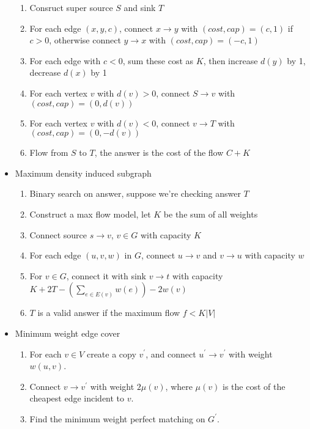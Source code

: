 \begin{itemize}[nosep]
    \begin{enumerate}[nosep]
      \item Consruct super source $S$ and sink $T$
      \item For each edge $(x, y, c)$, connect $x \rightarrow y$ with $(cost, cap) = (c, 1)$ if $c > 0$, otherwise connect $y \rightarrow x$ with $(cost, cap) = (-c, 1)$
      \item For each edge with $c < 0$, sum these cost as $K$, then increase $d(y)$ by 1, decrease $d(x)$ by 1
      \item For each vertex $v$ with $d(v) > 0$, connect $S \rightarrow v$ with $(cost, cap) = (0, d(v))$
      \item For each vertex $v$ with $d(v) < 0$, connect $v \rightarrow T$ with $(cost, cap) = (0, -d(v))$
      \item Flow from $S$ to $T$, the answer is the cost of the flow $C + K$
    \end{enumerate}
  \item Maximum density induced subgraph
    \begin{enumerate}[nosep]
      \item Binary search on answer, suppose we're checking answer $T$
      \item Construct a max flow model, let $K$ be the sum of all weights
      \item Connect source $s \rightarrow v$, $v \in G$ with capacity $K$
      \item For each edge $(u, v, w)$ in $G$, connect $u \rightarrow v$ and $v \rightarrow u$ with capacity $w$
      \item For $v \in G$, connect it with sink $v \rightarrow t$ with capacity $K + 2T - \left(\sum_{e \in E(v)}{w(e)}\right) - 2w(v)$
      \item $T$ is a valid answer if the maximum flow $f < K \lvert V \rvert$
    \end{enumerate}
  \item Minimum weight edge cover
    \begin{enumerate}[nosep]
      \item For each $v \in V$ create a copy $v^\prime$, and connect $u^\prime \to v^\prime$ with weight $w(u, v)$.
      \item Connect $v \to v^\prime$ with weight $2\mu(v)$, where $\mu(v)$ is the cost of the cheapest edge incident to $v$.
      \item Find the minimum weight perfect matching on $G^\prime$.
    \end{enumerate}

\end{itemize}
